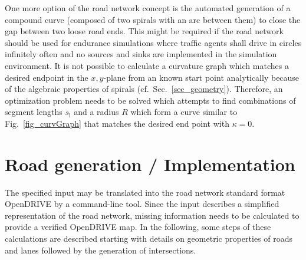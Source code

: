 \documentclass[a4paper, 10pt, conference]{ieeeconf}      %
\begin{document}
One more option of the road network concept is the automated generation of a compound curve (composed of two spirals with an arc between them) to close the gap between two loose road ends. This might be required if the road network should be used for endurance simulations where traffic agents shall drive in circles infinitely often and no sources and sinks are implemented in the simulation environment. It is not possible to calculate a curvature graph which matches a desired endpoint in the $x,y$-plane from an known start point analytically because of the algebraic properties of spirals (cf.~Sec.~\ref{sec_geometry}). Therefore, an optimization problem needs to be solved which attempts to find combinations of segment lengths $s_\text{i}$ and a radius $R$ which form a curve similar to Fig.~\ref{fig_curvGraph} that matches the desired end point with $\kappa=0$.

\section{Road generation / Implementation}
The specified input may be translated into the road network standard format OpenDRIVE by a command-line tool. Since the input describes a simplified representation of the road network, missing information needs to be calculated to provide a verified OpenDRIVE map. In the following, some steps of these calculations are described starting with details on geometric properties of roads and lanes followed by the generation of intersections. 
\end{document}
